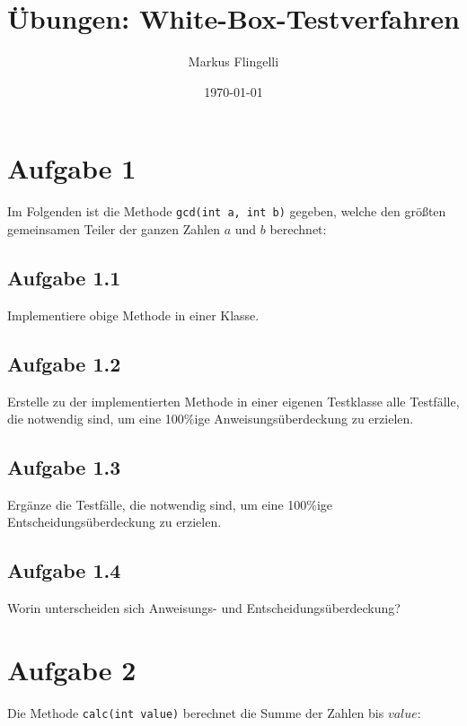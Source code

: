 

\title{Übungen: White-Box-Testverfahren}
\author{Markus Flingelli}
\date{\today}


\maketitle

\section*{Aufgabe 1}
Im Folgenden ist die Methode \lstinline{gcd(int a, int b)} gegeben, welche den größten gemeinsamen Teiler der ganzen Zahlen $a$ und $b$ berechnet:



\subsection*{Aufgabe 1.1}

Implementiere obige Methode in einer Klasse.

\subsection*{Aufgabe 1.2}

Erstelle zu der implementierten Methode in einer eigenen Testklasse alle Testfälle, die notwendig sind, um eine 100\%ige Anweisungsüberdeckung zu erzielen.

\subsection*{Aufgabe 1.3}

Ergänze die Testfälle, die notwendig sind, um eine 100\%ige Entscheidungsüberdeckung zu erzielen.

\subsection*{Aufgabe 1.4}

Worin unterscheiden sich Anweisungs- und Entscheidungsüberdeckung? 

\newpage
\section*{Aufgabe 2}
Die Methode \lstinline{calc(int value)} berechnet die Summe der Zahlen bis $value$:



